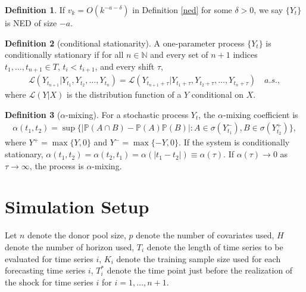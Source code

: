 \documentclass[12pt]{article}
\def\naturals{\mathbb{N}}
\def\mc#1{\mathcal{#1}} %
\def\mc#1{\mathcal{#1}}
\def\P{\mathbb{P}}
\theoremstyle{definition}
\theoremstyle{definition}
\newtheorem{definition}{Definition}
\begin{document}
\begin{definition}
  If $v_k= O(k^{-a-\delta})$ in Definition \ref{ned} for some $\delta > 0$, we say $\{Y_t\}$ is NED of size $-a$.
\end{definition}


\begin{definition}[conditional stationarity]
  A one-parameter process $\{Y_t\}$ is conditionally stationary if for all $n\in \naturals$ and every set of $n+1$ indices $t_1, \ldots, t_{n+1}\in T$, $t_i < t_{i+1}$, and every shift $\tau$,
  \begin{align*}
    \mc{L}(Y_{t_{n+1}}|Y_{t_1}, Y_{t_2}, \ldots, Y_{t_n})
    = \mc{L}(Y_{t_{n+1}+\tau}|Y_{t_1+\tau }, Y_{t_2+\tau }, \ldots, Y_{t_n+\tau })
    \quad a.s.,
  \end{align*}
  where $\mc{L}(Y|X)$ is the distribution function of a $Y$ conditional on $X$.
\end{definition}



\begin{definition}[$\alpha$-mixing]
  For a stochastic process $Y_t$, the $\alpha$-mixing coefficient is 
  \begin{align*}
    \alpha(t_1, t_2) = \sup \{
    |\P(A\cap B)-\P(A)\P(B)|\colon A\in \sigma(Y_{t_1}^{-}), B\in \sigma(Y_{t_2}^{+})\},
  \end{align*}
  where $Y^{+}=\max\{Y, 0\}$ and $Y^{-}=\max\{-Y, 0\}$. 
  If the system is conditionally stationary, $\alpha(t_1, t_2)=\alpha(t_2, t_1)=\alpha(|t_1-t_2|)\equiv \alpha(\tau)$. If $\alpha(\tau)\to 0$ as $\tau \to \infty$, the process is $\alpha$-mixing.
\end{definition}


\newpage

\section{Simulation Setup}

Let $n$ denote the donor pool size, $p$ denote the number of covariates used, $H$ denote the number of horizon used, $T_i$ denote the length of time series to be evaluated for time series $i$, $K_i$ denote the training sample size used for each  forecasting  time series $i$, $T_i^*$ denote the time point just before the realization of the shock for time series $i$ for $i = 1, \ldots, n+1$.
\end{document}
